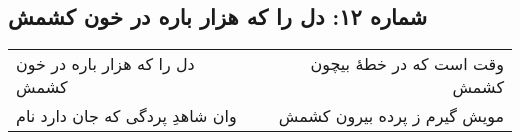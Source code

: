 \begin{center}
\section*{شماره ۱۲: دل را که هزار باره در خون کشمش}
\label{sec:012}
\begin{longtable}{l p{0.5cm} r}
دل را که هزار باره در خون کشمش
&&
وقت است که در خطهٔ بیچون کشمش
\\
وان شاهدِ پردگی که جان دارد نام
&&
مویش گیرم ز پرده بیرون کشمش
\\
\end{longtable}
\end{center}
